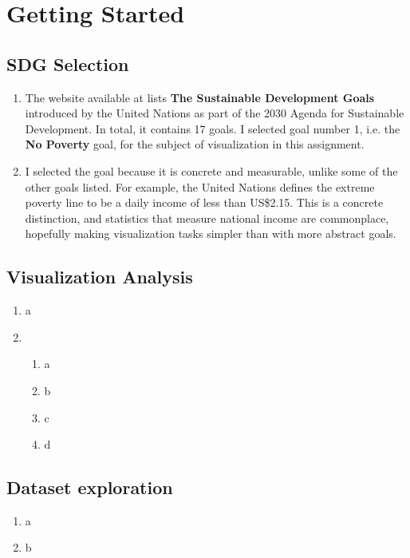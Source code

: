 \documentclass[11pt,a4paper,titlepage]{article}
\begin{document}



\section{Getting Started}

\subsection{SDG Selection}
\begin{enumerate}
    \item The website available at \cite{sdgs} lists \textbf{The Sustainable Development Goals} introduced by the United Nations as part of the 2030 Agenda for Sustainable Development. In total, it contains 17 goals. I selected goal number 1, i.e. the \textbf{No Poverty} goal, for the subject of visualization in this assignment.
    \item I selected the goal because it is concrete and measurable, unlike some of the other goals listed. For example, the United Nations \cite{endpov} defines the extreme poverty line to be a daily income of less than US\$2.15. This is a concrete distinction, and statistics that measure national income are commonplace, hopefully making visualization tasks simpler than with more abstract goals.
\end{enumerate}

\subsection{Visualization Analysis}
\begin{enumerate}
    \item a
    \item \begin{enumerate}
        \item a
        \item b
        \item c
        \item d
    \end{enumerate}
\end{enumerate}
\subsection{Dataset exploration}
\begin{enumerate}
    \item a
    \item b
\end{enumerate}


\end{document}
